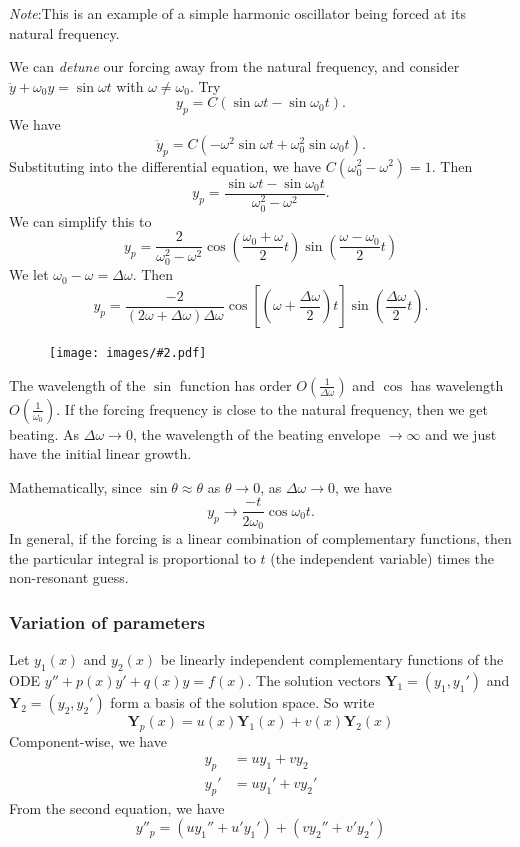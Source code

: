 \documentclass[a4paper]{article}
\theoremstyle{definition}
\newcommand{\mb}[1]{\mathbf{#1}}
\newcommand{\note}{\noindent \emph{Note}:\;}
\newcommand{\img}[2][]{\begin{figure}[ht]\centering\texttt{[image: images/\#2.pdf]}\end{figure}}
\begin{document}
\note This is an example of a simple harmonic oscillator being forced at its natural frequency.

We can \emph{detune} our forcing away from the natural frequency, and consider $\ddot y + \omega_0 y = \sin \omega t$ with $\omega \not= \omega_0$. Try
\[
y_p = C(\sin \omega t - \sin \omega_0 t).
\]
We have
\[
\ddot y_p = C(-\omega^2 \sin \omega t + \omega_0^2 \sin\omega_0 t).
\]
Substituting into the differential equation, we have $C(\omega_0^2 - \omega^2) = 1$. Then 
\[
y_p = \frac{\sin \omega t - \sin \omega_0t}{\omega_0^2 - \omega^2}.
\]
We can simplify this to 
\[
y_p = \frac{2}{\omega_0^2 - \omega^2} \cos \left(\frac{\omega_0 + \omega}{2}t\right) \sin \left(\frac{\omega - \omega_0}{2} t\right)
\]
We let $\omega_0 - \omega = \Delta \omega$. Then
\[
y_p = \frac{-2}{(2\omega + \Delta \omega)\Delta \omega}\cos \left[\left(\omega + \frac{\Delta \omega}{2}\right)t\right] \sin \left(\frac{\Delta \omega}{2}t\right).
\]
\img[width=300pt]{de_15_1}

\newpage %
The wavelength of the $\sin$ function has order $O(\frac{1}{\Delta \omega})$ and $\cos$ has wavelength $O(\frac{1}{\omega_0})$. If the forcing frequency is close to the natural frequency, then we get beating. As $\Delta\omega\to 0$, the wavelength of the beating envelope $\to \infty$ and we just have the initial linear growth.

Mathematically, since $\sin\theta \approx \theta$ as $\theta \to 0$, as $\Delta\omega \to 0$, we have
\[
y_p\to \frac{-t}{2\omega_0}\cos\omega_0 t.
\]
In general, if the forcing is a linear combination of complementary functions, then the particular integral is proportional to $t$ (the independent variable) times the non-resonant guess.

\subsubsection{Variation of parameters}
Let $y_1(x)$ and $y_2(x)$ be linearly independent complementary functions of the ODE $y'' + p(x)y' + q(x)y = f(x)$. The solution vectors $\mb{Y}_1 = (y_1, y_1')$ and $\mb{Y}_2 = (y_2, y_2')$ form a basis of the solution space. So write
\[
\mb{Y}_p(x) = u(x)\mb{Y}_1(x) + v(x)\mb{Y}_2(x)
\]
Component-wise, we have 
\begin{align*}
  y_p &= uy_1 + vy_2 \tag{a}\\
  y_p' &= uy_1' + vy_2' \tag{b}
\end{align*}
From the second equation, we have
\[
y''_p  = (uy_1'' + u'y_1') + (vy_2'' + v'y_2') \tag{c}
\]
\end{document}
